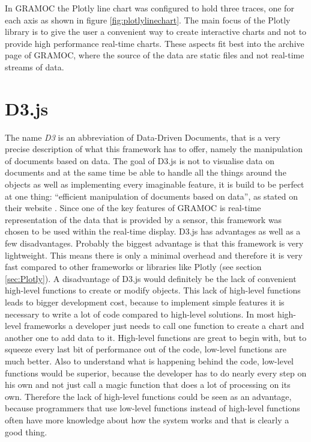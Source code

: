 In GRAMOC the Plotly line chart was configured to hold three traces, one for each axis as shown in figure \vref{fig:plotlylinechart}. The main focus of the Plotly library is to give the user a convenient way to create interactive charts and not to provide high performance real-time charts. These aspects fit best into the archive page of GRAMOC, where the source of the data are static files and not real-time streams of data.

\section{D3.js}
The name \textit{D3} is an abbreviation of Data-Driven Documents, that is a very precise description of what this framework has to offer, namely the manipulation of documents based on data. The goal of D3.js is not to visualise data on documents and at the same time be able to handle all the things around the objects as well as implementing every imaginable feature, it is build to be perfect at one thing: ``efficient manipulation of documents based on data'', as stated on their website \autocite{d3}. Since one of the key features of GRAMOC is real-time representation of the data that is provided by a sensor, this framework was chosen to be used within the real-time display. D3.js has advantages as well as a few disadvantages. Probably the biggest advantage is that this framework is very lightweight. This means there is only a minimal overhead and therefore it is very fast compared to other frameworks or libraries like Plotly (see section \vref{sec:Plotly}). A disadvantage of D3.js would definitely be the lack of convenient high-level functions to create or modify objects. This lack of high-level functions leads to bigger development cost, because to implement simple features it is necessary to write a lot of code compared to high-level solutions. In most high-level frameworks a developer just needs to call one function to create a chart and another one to add data to it. High-level functions are great to begin with, but to squeeze every last bit of performance out of the code, low-level functions are much better. Also to understand what is happening behind the code, low-level functions would be superior, because the developer has to do nearly every step on his own and not just call a magic function that does a lot of processing on its own. Therefore the lack of high-level functions could be seen as an advantage, because programmers that use low-level functions instead of high-level functions often have more knowledge about how the system works and that is clearly a good thing.

